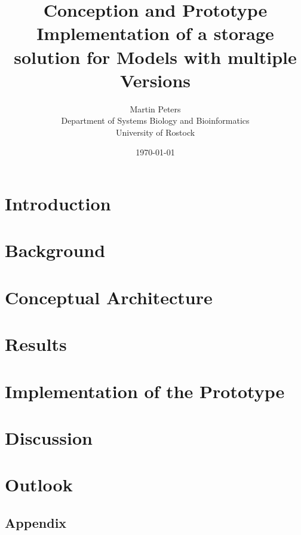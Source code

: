 \documentclass[12pt, a4paper, titlepage]{book}
\title{Conception and Prototype Implementation of a storage solution for Models with multiple Versions}
\author{Martin Peters\\[12pt]
	\small Department of Systems Biology and Bioinformatics\\
	\small University of Rostock}
\date{\today}
\begin{document}
	\maketitle
	\tableofcontents
	
	\chapter{Introduction}
	
	
	\chapter{Background}
	
	
	\chapter{Conceptual Architecture}
	
	
	\chapter{Results}
	
	
	\chapter{Implementation of the Prototype}
	
	
	\chapter{Discussion}
	
	
	\chapter{Outlook}
	
	
	
	
	
	\begin{appendix}
		\listoffigures
		
		\chapter*{Appendix}
		
	\end{appendix}
\end{document}
